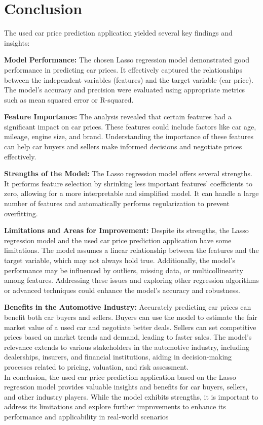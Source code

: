 \documentclass{article}
\begin{document}
\section{Conclusion}
The used car price prediction application yielded several key findings and insights:
\begin{flushleft}
\textbf{Model Performance:} The chosen Lasso regression model demonstrated good performance in predicting car prices. It effectively captured the relationships between the independent variables (features) and the target variable (car price). The model's accuracy and precision were evaluated using appropriate metrics such as mean squared error or R-squared.

\textbf{Feature Importance:} The analysis revealed that certain features had a significant impact on car prices. These features could include factors like car age, mileage, engine size, and brand. Understanding the importance of these features can help car buyers and sellers make informed decisions and negotiate prices effectively.

\textbf{Strengths of the Model:} The Lasso regression model offers several strengths. It performs feature selection by shrinking less important features' coefficients to zero, allowing for a more interpretable and simplified model. It can handle a large number of features and automatically performs regularization to prevent overfitting.

\textbf{Limitations and Areas for Improvement:} Despite its strengths, the Lasso regression model and the used car price prediction application have some limitations. The model assumes a linear relationship between the features and the target variable, which may not always hold true. Additionally, the model's performance may be influenced by outliers, missing data, or multicollinearity among features. Addressing these issues and exploring other regression algorithms or advanced techniques could enhance the model's accuracy and robustness.

\textbf{Benefits in the Automotive Industry:} Accurately predicting car prices can benefit both car buyers and sellers. Buyers can use the model to estimate the fair market value of a used car and negotiate better deals. Sellers can set competitive prices based on market trends and demand, leading to faster sales. The model's relevance extends to various stakeholders in the automotive industry, including dealerships, insurers, and financial institutions, aiding in decision-making processes related to pricing, valuation, and risk assessment.\\

In conclusion, the used car price prediction application based on the Lasso regression model provides valuable insights and benefits for car buyers, sellers, and other industry players. While the model exhibits strengths, it is important to address its limitations and explore further improvements to enhance its performance and applicability in real-world scenarios
\end{flushleft}
\end{document}
